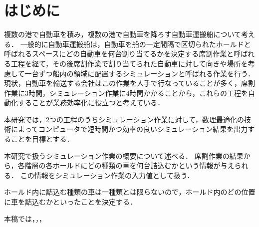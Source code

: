 \chapter{はじめに}

複数の港で自動車を積み，複数の港で自動車を降ろす自動車運搬船について考える．
一般的に自動車運搬船は，自動車を船の一定間隔で区切られたホールドと呼ばれるスペースにどの自動車を何台割り当てるかを決定する席割作業と呼ばれる工程を経て，その後席割作業で割り当てられた自動車に対して向きや場所を考慮して一台ずつ船内の領域に配置するシミュレーションと呼ばれる作業を行う．
現状，自動車を輸送する会社はこの作業を人手で行なっていることが多く，席割作業に3時間，シミュレーション作業に4時間かかることから，これらの工程を自動化することが業務効率化に役立つと考えている．

本研究では，2つの工程のうちシミュレーション作業に対して，数理最適化の技術によってコンピュータで短時間かつ効率の良いシミュレーション結果を出力することを目標とする．

本研究で扱うシミュレーション作業の概要について述べる．
席割作業の結果から，各階層の各ホールドにどの種類の車を何台詰込むかという情報が与えられる．
この情報をシミュレーション作業の入力値として扱う．

ホールド内に詰込む種類の車は一種類とは限らないので，ホールド内のどの位置に車を詰込むかといったことを決定する．


本稿では，，，
